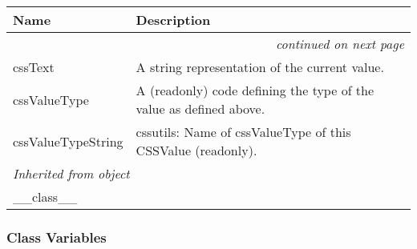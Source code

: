     \vspace{-1cm}
\hspace{\varindent}\begin{longtable}{|p{\varnamewidth}|p{\vardescrwidth}|l}
\cline{1-2}
\cline{1-2} \centering \textbf{Name} & \centering \textbf{Description}& \\
\cline{1-2}
\endhead\cline{1-2}\multicolumn{3}{r}{\small\textit{continued on next page}}\\\endfoot\cline{1-2}
\endlastfoot\raggedright c\-s\-s\-T\-e\-x\-t\- & \raggedright A string representation of the current value.&\\
\cline{1-2}
\raggedright c\-s\-s\-V\-a\-l\-u\-e\-T\-y\-p\-e\- & \raggedright A (readonly) code defining the type of the value as defined above.&\\
\cline{1-2}
\raggedright c\-s\-s\-V\-a\-l\-u\-e\-T\-y\-p\-e\-S\-t\-r\-i\-n\-g\- & \raggedright cssutils: Name of cssValueType of this CSSValue (readonly).&\\
\cline{1-2}
\multicolumn{2}{|l|}{\textit{Inherited from object}}\\
\multicolumn{2}{|p{\varwidth}|}{\raggedright \_\_class\_\_}\\
\cline{1-2}
\end{longtable}



  \subsubsection{Class Variables}

